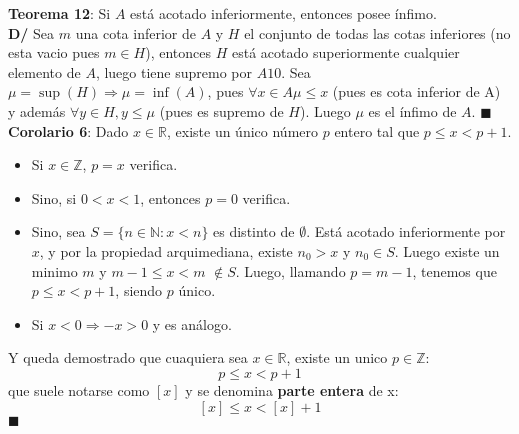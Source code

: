 \documentclass[11pt,a4paper]{article}
\newcommand*{\QEDA}{\null\nobreak\hfill\ensuremath{\blacksquare}}
\begin{document}
\noindent \textbf{Teorema 12}: Si $A$ est\'a acotado inferiormente, entonces posee \'infimo.\\
\textbf{D/} Sea $m$ una cota inferior de $A$ y $H$ el conjunto de todas las cotas inferiores (no esta vacio pues $m \in H$), entonces $H$ est\'a acotado superiormente cualquier elemento de $A$, luego tiene supremo por $A10$. Sea $\mu = \sup(H) \Rightarrow \mu = \inf(A)$, pues $\forall x \in A \mu \leq x$ (pues es cota inferior de A) y adem\'as $\forall y \in H, y \leq \mu$ (pues es supremo de $H$). Luego $\mu$ es el \'infimo de $A$. \QEDA\\
\newpage
\noindent\textbf{Corolario 6}: Dado $x \in \mathbb{R}$, existe un \'unico n\'umero $p$ entero tal que $p \leq x < p + 1$.
\begin{itemize}
\item Si $x \in \mathbb{Z}$, $p=x$ verifica.
\item Sino, si $0 < x < 1$, entonces $p = 0$ verifica.
\item Sino, sea $S = \{ n \in \mathbb{N} : x < n \}$ es distinto de $\emptyset$. Est\'a acotado inferiormente por $x$, y por la propiedad arquimediana, existe $n_0 > x$ y $n_0 \in S$. Luego existe un minimo $m$ y $m-1 \leq x < m$ $ \not \in S$. Luego, llamando $p = m-1$, tenemos que $p \leq x < p+1$, siendo $p$ \'unico.
\item Si $x < 0 \Rightarrow -x > 0$ y es an\'alogo.
\end{itemize}
Y queda demostrado que cuaquiera sea $x \in \mathbb{R}$, existe un unico $p \in \mathbb{Z} : $
$$p \leq x < p+1$$
que suele notarse como $[x]$ y se denomina \textbf{parte entera} de x:
$$[x] \leq x < [x] + 1$$ \QEDA
\end{document}
